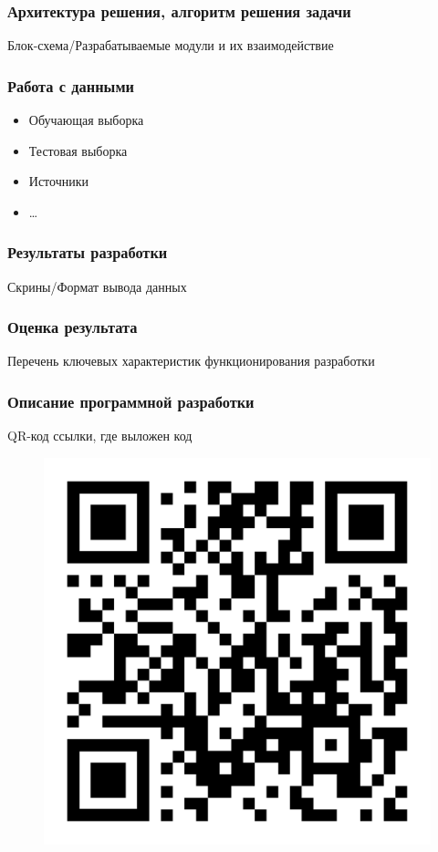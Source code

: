 \documentclass[pdf, hyperref={unicode}, aspectratio=169]{beamer}
\begin{document}
\begin{frame}
\frametitle{Архитектура решения, алгоритм решения задачи}

Блок-схема/Разрабатываемые модули и их взаимодействие
\end{frame}


\begin{frame}
\frametitle{Работа с данными}

\begin{itemize}
	\item Обучающая выборка
	\item Тестовая выборка
	\item Источники
	\item …
\end{itemize}
\end{frame}


\begin{frame}
\frametitle{Результаты разработки}

Скрины/Формат вывода данных
\end{frame}


\begin{frame}
\frametitle{Оценка результата}

Перечень ключевых характеристик функционирования разработки
\end{frame}


\begin{frame}
\frametitle{Описание программной разработки}

QR-код ссылки, где выложен код

\begin{figure}
\includegraphics[height=0.7\textheight]{img/qr-code}
\end{figure}
\end{frame}
\end{document}

